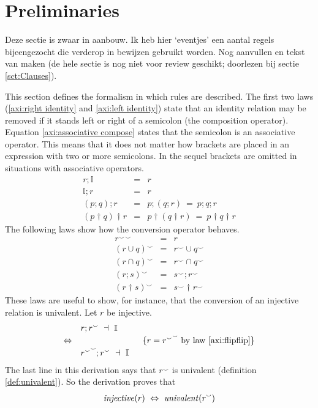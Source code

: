 \documentclass[11pt,a4paper,fleqn,oneside]{article}
\newcommand{\relAdd}{\dagger}
\def\id#1{\text{\em #1\/}}
\newcommand{\univalent}[1]{\id{univalent}(#1)}
\newcommand{\injective}[1]{\id{injective}(#1)}
\newcommand{\iden}{\mathbb{I}}
\newcommand{\flip}[1]{{#1}^\smallsmile}
\newcommand{\compose}{;}
\newcommand{\subs}{\dashv}
\begin{document}
\section{Preliminaries}
	Deze sectie is zwaar in aanbouw.
	Ik heb hier `eventjes' een aantal regels bijeengezocht die verderop in bewijzen gebruikt worden.
	Nog aanvullen en tekst van maken (de hele sectie is nog niet voor review geschikt; doorlezen bij sectie \ref{sct:Clauses}).
	
	This section defines the formalism in which rules are described.
	The first two laws (\ref{axi:right identity} and \ref{axi:left identity})
	state that an identity relation may be removed
	if it stands left or right of a semicolon (the composition operator).
	Equation \ref{axi:associative compose} states that the semicolon is an associative operator.
	This means that it does not matter how brackets are placed in an expression with two or more semicolons.
	In the sequel brackets are omitted in situations with associative operators.
\begin{eqnarray}
r\compose\iden&=&r\label{axi:right identity}\\
\iden\compose r&=&r\label{axi:left identity}\\
(p\compose q)\compose r&=&p\compose(q\compose r)\ =\ p\compose q\compose r\label{axi:associative compose}\\
(p\relAdd q)\relAdd r&=&p\relAdd(q\relAdd r)\ =\ p\relAdd q\relAdd r\label{axi:associative relAdd}
\end{eqnarray}
	The following laws show how the conversion operator behaves.
\begin{eqnarray}
\flip{\flip{r}}&=&r\label{axi:flipflip}\\
\flip{(r\cup q)}&=&\flip{r}\cup\flip{q}\label{axi:flipcup}\\
\flip{(r\cap q)}&=&\flip{r}\cap\flip{q}\label{axi:flipcap}\\
\flip{(r\compose s)}&=&\flip{s}\compose\flip{r}\label{axi:flipcombi}\\
\flip{(r\relAdd s)}&=&\flip{s}\relAdd\flip{r}\label{axi:fliprelAdd}
\end{eqnarray}
	These laws are useful to show, for instance, that the conversion of an injective relation is univalent.
	Let $r$ be injective.
\[\begin{array}{cl}
&r\compose\flip{r}\ \subs\ \iden\\
\Leftrightarrow&\hspace{1in}\{\text{$r=\flip{\flip{r}}$ by law \ref{axi:flipflip}}\}\\
&\flip{\flip{r}}\compose\flip{r}\ \subs\ \iden
\end{array}\]
	The last line in this derivation says that $\flip{r}$ is univalent (definition \ref{def:univalent}).
	So the derivation proves that
\begin{equation}
\injective{r}\ \Leftrightarrow\ \univalent{\flip{r}}\label{eqn:dual injective univalent}
\end{equation}
\end{document}
